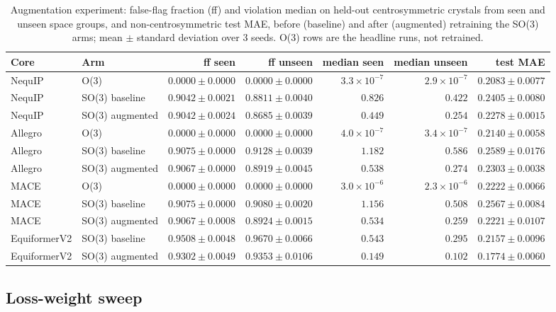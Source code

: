 \begin{table}[htbp]
\centering
\scriptsize
\caption{Augmentation experiment: false-flag fraction (ff) and violation median on held-out centrosymmetric crystals from seen and unseen space groups, and non-centrosymmetric test MAE, before (baseline) and after (augmented) retraining the SO(3) arms; mean $\pm$ standard deviation over 3 seeds. O(3) rows are the headline runs, not retrained.}
\label{stab:e1}
\begin{tabular}{llrrrrr}
\toprule
Core & Arm & ff seen & ff unseen & median seen & median unseen & test MAE \\
\midrule
NequIP & O(3) & $0.0000 \pm 0.0000$ & $0.0000 \pm 0.0000$ & $3.3\times10^{-7}$ & $2.9\times10^{-7}$ & $0.2083 \pm 0.0077$ \\
NequIP & SO(3) baseline & $0.9042 \pm 0.0021$ & $0.8811 \pm 0.0040$ & $0.826$ & $0.422$ & $0.2405 \pm 0.0080$ \\
NequIP & SO(3) augmented & $0.9042 \pm 0.0024$ & $0.8685 \pm 0.0039$ & $0.449$ & $0.254$ & $0.2278 \pm 0.0015$ \\
Allegro & O(3) & $0.0000 \pm 0.0000$ & $0.0000 \pm 0.0000$ & $4.0\times10^{-7}$ & $3.4\times10^{-7}$ & $0.2140 \pm 0.0058$ \\
Allegro & SO(3) baseline & $0.9075 \pm 0.0000$ & $0.9128 \pm 0.0039$ & $1.182$ & $0.586$ & $0.2589 \pm 0.0176$ \\
Allegro & SO(3) augmented & $0.9067 \pm 0.0000$ & $0.8919 \pm 0.0045$ & $0.538$ & $0.274$ & $0.2303 \pm 0.0038$ \\
MACE & O(3) & $0.0000 \pm 0.0000$ & $0.0000 \pm 0.0000$ & $3.0\times10^{-6}$ & $2.3\times10^{-6}$ & $0.2222 \pm 0.0066$ \\
MACE & SO(3) baseline & $0.9075 \pm 0.0000$ & $0.9080 \pm 0.0020$ & $1.156$ & $0.508$ & $0.2567 \pm 0.0084$ \\
MACE & SO(3) augmented & $0.9067 \pm 0.0008$ & $0.8924 \pm 0.0015$ & $0.534$ & $0.259$ & $0.2221 \pm 0.0107$ \\
EquiformerV2 & SO(3) baseline & $0.9508 \pm 0.0048$ & $0.9670 \pm 0.0066$ & $0.543$ & $0.295$ & $0.2157 \pm 0.0096$ \\
EquiformerV2 & SO(3) augmented & $0.9302 \pm 0.0049$ & $0.9353 \pm 0.0106$ & $0.149$ & $0.102$ & $0.1774 \pm 0.0060$ \\
\bottomrule
\end{tabular}
\end{table}

\subsection*{Loss-weight sweep}

